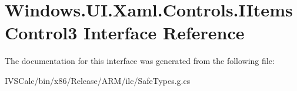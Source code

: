 \hypertarget{interface_windows_1_1_u_i_1_1_xaml_1_1_controls_1_1_i_items_control3}{}\section{Windows.\+U\+I.\+Xaml.\+Controls.\+I\+Items\+Control3 Interface Reference}
\label{interface_windows_1_1_u_i_1_1_xaml_1_1_controls_1_1_i_items_control3}


The documentation for this interface was generated from the following file\+:\begin{DoxyCompactItemize}
\item 
I\+V\+S\+Calc/bin/x86/\+Release/\+A\+R\+M/ilc/Safe\+Types.\+g.\+cs\end{DoxyCompactItemize}
